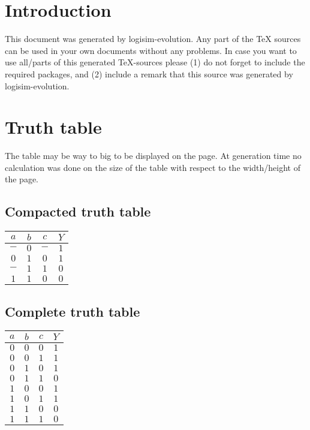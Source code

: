 \documentclass [15pt,a4paper,twoside]{article}
\begin{document}
\section{Introduction}
This document was generated by logisim-evolution. Any part of the TeX sources can be used in your own documents without any problems. In case you want to use all/parts of this generated TeX-sources please (1) do not forget to include the required packages, and (2) include a remark that this source was generated by logisim-evolution.
\section{Truth table}
The table may be way to big to be displayed on the page. At generation time no calculation was done on the size of the table with respect to the width/height of the page.
\subsection{Compacted truth table}
\begin{center}
\begin{tabular}{ccc|c}
$a$&$b$&$c$&$Y$\\
\hline
$-$&$0$&$-$&$1$\\
$0$&$1$&$0$&$1$\\
$-$&$1$&$1$&$0$\\
$1$&$1$&$0$&$0$\\

\end{tabular}
\end{center}
\subsection{Complete truth table}
\begin{center}
\begin{tabular}{ccc|c}
$a$&$b$&$c$&$Y$\\
\hline
$0$&$0$&$0$&$1$\\
$0$&$0$&$1$&$1$\\
$0$&$1$&$0$&$1$\\
$0$&$1$&$1$&$0$\\
$1$&$0$&$0$&$1$\\
$1$&$0$&$1$&$1$\\
$1$&$1$&$0$&$0$\\
$1$&$1$&$1$&$0$\\

\end{tabular}
\end{center}
\end{document}
